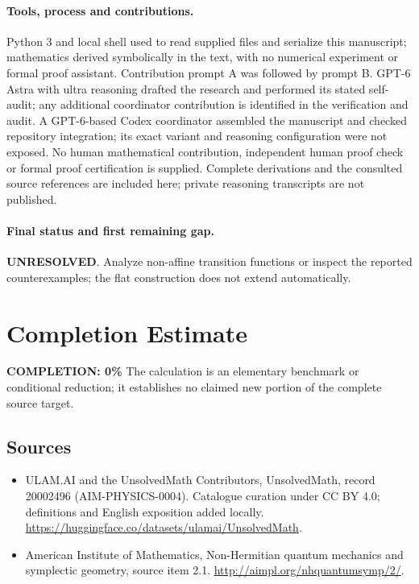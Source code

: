 \documentclass[11pt]{article}
\begin{document}
\paragraph{Tools, process and contributions.}
Python 3 and local shell used to read supplied files and serialize this manuscript; mathematics derived symbolically in the text, with no numerical experiment or formal proof assistant. Contribution prompt A was followed by prompt B. GPT-6 Astra with ultra reasoning drafted the research and performed its stated self-audit; any additional coordinator contribution is identified in the verification and audit. A GPT-6-based Codex coordinator assembled the manuscript and checked repository integration; its exact variant and reasoning configuration were not exposed. No human mathematical contribution, independent human proof check or formal proof certification is supplied. Complete derivations and the consulted source references are included here; private reasoning transcripts are not published.

\paragraph{Final status and first remaining gap.}
\textbf{UNRESOLVED}. Analyze non-affine transition functions or inspect the reported counterexamples; the flat construction does not extend automatically.

\section{Completion Estimate}
\noindent\textbf{COMPLETION: 0\%}
The calculation is an elementary benchmark or conditional reduction; it establishes no claimed new portion of the complete source target.

\subsection{Sources}
\begin{itemize}
\item[\hypertarget{source:20002496:1}{S1}] ULAM.AI and the UnsolvedMath Contributors, UnsolvedMath, record 20002496 (AIM-PHYSICS-0004). Catalogue curation under CC BY 4.0; definitions and English exposition added locally.
\url{https://huggingface.co/datasets/ulamai/UnsolvedMath}.
\item[\hypertarget{source:20002496:2}{S2}] American Institute of Mathematics, Non-Hermitian quantum mechanics and symplectic geometry, source item 2.1.
\url{http://aimpl.org/nhquantumsymp/2/}.
\end{itemize}
\label{end:20002496}
\end{document}
